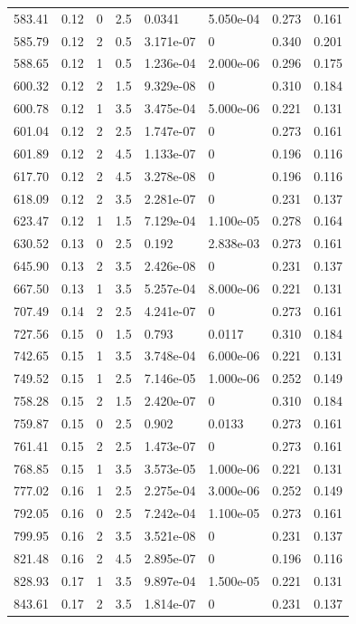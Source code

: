\documentclass[preview]{standalone}
\begin{document}
{{{\begin{tabular}{L{1.2cm}C{1.2cm} C{0.3cm}C{0.5cm} C{1.4cm}C{1.4cm} C{1.4cm}C{1.4cm}}
  583.41  &  0.12  & 0     & 2.5 &  0.0341  & 5.050e-04  & 0.273 &  0.161   \\ 
  585.79  &  0.12  & 2     & 0.5 &  3.171e-07  & 0  & 0.340 &  0.201   \\ 
  588.65  &  0.12  & 1     & 0.5 &  1.236e-04  & 2.000e-06  & 0.296 &  0.175   \\ 
  600.32  &  0.12  & 2     & 1.5 &  9.329e-08  & 0  & 0.310 &  0.184   \\ 
  600.78  &  0.12  & 1     & 3.5 &  3.475e-04  & 5.000e-06  & 0.221 &  0.131   \\ 
  601.04  &  0.12  & 2     & 2.5 &  1.747e-07  & 0  & 0.273 &  0.161   \\ 
  601.89  &  0.12  & 2     & 4.5 &  1.133e-07  & 0  & 0.196 &  0.116   \\ 
  617.70  &  0.12  & 2     & 4.5 &  3.278e-08  & 0  & 0.196 &  0.116   \\ 
  618.09  &  0.12  & 2     & 3.5 &  2.281e-07  & 0  & 0.231 &  0.137   \\ 
  623.47  &  0.12  & 1     & 1.5 &  7.129e-04  & 1.100e-05  & 0.278 &  0.164   \\ 
  630.52  &  0.13  & 0     & 2.5 &  0.192  & 2.838e-03  & 0.273 &  0.161   \\ 
  645.90  &  0.13  & 2     & 3.5 &  2.426e-08  & 0  & 0.231 &  0.137   \\ 
  667.50  &  0.13  & 1     & 3.5 &  5.257e-04  & 8.000e-06  & 0.221 &  0.131   \\ 
  707.49  &  0.14  & 2     & 2.5 &  4.241e-07  & 0  & 0.273 &  0.161   \\ 
  727.56  &  0.15  & 0     & 1.5 &  0.793  & 0.0117  & 0.310 &  0.184   \\ 
  742.65  &  0.15  & 1     & 3.5 &  3.748e-04  & 6.000e-06  & 0.221 &  0.131   \\ 
  749.52  &  0.15  & 1     & 2.5 &  7.146e-05  & 1.000e-06  & 0.252 &  0.149   \\ 
  758.28  &  0.15  & 2     & 1.5 &  2.420e-07  & 0  & 0.310 &  0.184   \\ 
  759.87  &  0.15  & 0     & 2.5 &  0.902  & 0.0133  & 0.273 &  0.161   \\ 
  761.41  &  0.15  & 2     & 2.5 &  1.473e-07  & 0  & 0.273 &  0.161   \\ 
  768.85  &  0.15  & 1     & 3.5 &  3.573e-05  & 1.000e-06  & 0.221 &  0.131   \\ 
  777.02  &  0.16  & 1     & 2.5 &  2.275e-04  & 3.000e-06  & 0.252 &  0.149   \\ 
  792.05  &  0.16  & 0     & 2.5 &  7.242e-04  & 1.100e-05  & 0.273 &  0.161   \\ 
  799.95  &  0.16  & 2     & 3.5 &  3.521e-08  & 0  & 0.231 &  0.137   \\ 
  821.48  &  0.16  & 2     & 4.5 &  2.895e-07  & 0  & 0.196 &  0.116   \\ 
  828.93  &  0.17  & 1     & 3.5 &  9.897e-04  & 1.500e-05  & 0.221 &  0.131   \\ 
  843.61  &  0.17  & 2     & 3.5 &  1.814e-07  & 0  & 0.231 &  0.137   \\ 
\hline 
\end{tabular} 

}}}
\end{document}
